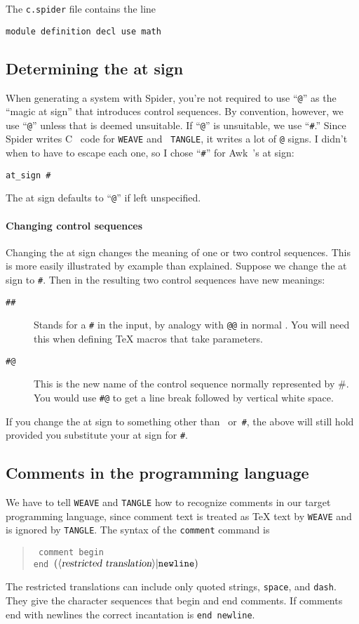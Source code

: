 The {\tt c.spider} file contains the line
\begin{verbatim}
module definition decl use math
\end{verbatim}

\subsection{Determining the at sign}
When generating a {\WEB} system with {Spider}, you're not required
to use ``{\tt @}'' as the ``magic at sign'' that introduces {\WEB}
control sequences.
By convention, however, we use ``{\tt @}'' unless that is deemed
unsuitable.
If ``{\tt @}'' is unsuitable, we use ``{\tt \#}.''
Since {Spider} writes C~{\WEB} code for {\tt WEAVE} and {\tt
TANGLE}, it writes a lot of {\tt @} signs.
I didn't when to have to escape each one, so I chose
``{\tt \#}'' for Awk~{\WEB}'s at sign:
\begin{verbatim}
at_sign #
\end{verbatim}
The at sign defaults to ``{\tt @}'' if left unspecified.

\paragraph{Changing control sequences}
Changing the at sign changes the meaning of one or two control
sequences.
This is more easily illustrated by example than explained.
Suppose we change the at sign to {\tt\#}.
Then in the resulting {\WEB} two control sequences have new meanings:
\begin{description}
\item[{\tt \#\#}]
Stands for a {\tt \#} in the input, by analogy with {\tt @@} in normal
{\WEB}.
You will need this when defining {\TeX} macros that take parameters.
\item[{\tt \#@}]
This is the new name of the control sequence normally represented by
{\tt@\#}.
 You would use {\tt\#@} to get a line break followed by vertical
white space.
\end{description}
If you change the at sign to something other than {\tt@}~or~{\tt\#},
the above will still hold provided you substitute your at sign for
{\tt\#}.


\subsection{Comments in the programming language}
We have to tell {\tt WEAVE} and {\tt TANGLE} how to recognize
comments in our target programming language, since comment text is
treated as {\TeX} text by {\tt WEAVE} and is ignored by {\tt TANGLE}.
The syntax of the {\tt comment} command is
\begin{quote}
\tt
comment begin  \\
\null\qquad end $(\mbox{$\langle\hbox{\sl restricted translation\/}\rangle$}|{\tt newline})$
\end{quote}
The restricted translations can include  only  quoted
strings, {\tt space}, and 
{\tt dash}.
They give the character sequences that begin and end comments.
If comments end with newlines the correct incantation is {\tt end
newline}.


